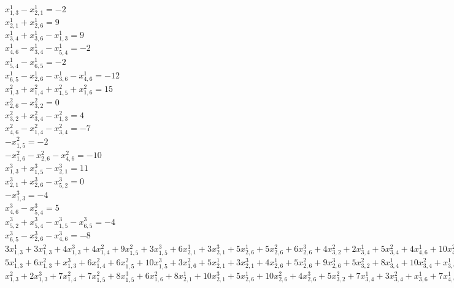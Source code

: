 \documentclass{article}
\begin{document}
\begin{center}
$x_{1,3}^{1} - x_{2,1}^{1} = -2$\\
$x_{2,1}^{1} + x_{2,6}^{1} = 9$\\
$x_{3,4}^{1} + x_{3,6}^{1} - x_{1,3}^{1} = 9$\\
$x_{4,6}^{1} - x_{3,4}^{1} - x_{5,4}^{1} = -2$\\
$x_{5,4}^{1} - x_{6,5}^{1} = -2$\\
$x_{6,5}^{1} - x_{2,6}^{1} - x_{3,6}^{1} - x_{4,6}^{1} = -12$\\
\bigskip
$x_{1,3}^{2} + x_{1,4}^{2} + x_{1,5}^{2} + x_{1,6}^{2} = 15$\\
$x_{2,6}^{2} - x_{3,2}^{2} = 0$\\
$x_{3,2}^{2} + x_{3,4}^{2} - x_{1,3}^{2} = 4$\\
$x_{4,6}^{2} - x_{1,4}^{2} - x_{3,4}^{2} = -7$\\
$- x_{1,5}^{2} = -2$\\
$- x_{1,6}^{2} - x_{2,6}^{2} - x_{4,6}^{2} = -10$\\
\bigskip
$x_{1,3}^{3} + x_{1,5}^{3} - x_{2,1}^{3} = 11$\\
$x_{2,1}^{3} + x_{2,6}^{3} - x_{5,2}^{3} = 0$\\
$- x_{1,3}^{3} = -4$\\
$x_{4,6}^{3} - x_{5,4}^{3} = 5$\\
$x_{5,2}^{3} + x_{5,4}^{3} - x_{1,5}^{3} - x_{6,5}^{3} = -4$\\
$x_{6,5}^{3} - x_{2,6}^{3} - x_{4,6}^{3} = -8$\\
\bigskip
$3x_{1,3}^{1} +3x_{1,3}^{2} +4x_{1,3}^{3} +4x_{1,4}^{2} +9x_{1,5}^{2} +3x_{1,5}^{3} +6x_{2,1}^{1} +3x_{2,1}^{3} +5x_{2,6}^{1} +5x_{2,6}^{2} +6x_{2,6}^{3} +4x_{3,2}^{2} +2x_{3,4}^{1} +5x_{3,4}^{2} +4x_{4,6}^{1} +10x_{4,6}^{2} +2x_{4,6}^{3} +2x_{5,2}^{3} +9x_{5,4}^{1} +5x_{5,4}^{3} +7x_{6,5}^{1} +8x_{6,5}^{3} = 948$\\
\bigskip
$5x_{1,3}^{1} +6x_{1,3}^{2} +x_{1,3}^{3} +6x_{1,4}^{2} +6x_{1,5}^{2} +10x_{1,5}^{3} +3x_{1,6}^{2} +5x_{2,1}^{1} +3x_{2,1}^{3} +4x_{2,6}^{1} +5x_{2,6}^{2} +9x_{2,6}^{3} +5x_{3,2}^{2} +8x_{3,4}^{1} +10x_{3,4}^{2} +x_{3,6}^{1} +x_{4,6}^{1} +5x_{4,6}^{2} +9x_{4,6}^{3} +7x_{5,2}^{3} +7x_{5,4}^{1} +2x_{5,4}^{3} +5x_{6,5}^{1} +5x_{6,5}^{3} = 631$\\
\bigskip
$x_{1,3}^{2} +2x_{1,3}^{3} +7x_{1,4}^{2} +7x_{1,5}^{2} +8x_{1,5}^{3} +6x_{1,6}^{2} +8x_{2,1}^{1} +10x_{2,1}^{3} +5x_{2,6}^{1} +10x_{2,6}^{2} +4x_{2,6}^{3} +5x_{3,2}^{2} +7x_{3,4}^{1} +3x_{3,4}^{2} +x_{3,6}^{1} +7x_{4,6}^{1} +x_{4,6}^{2} +x_{4,6}^{3} +9x_{5,2}^{3} +5x_{5,4}^{1} +7x_{5,4}^{3} +2x_{6,5}^{1} +2x_{6,5}^{3} = 590$\\

\end{center}
\end{document}
